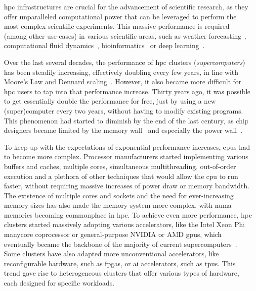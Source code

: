 \gls{hpc} infrastructures are crucial for the advancement of scientific
research, as they offer unparalleled computational power that can be leveraged to perform the most
complex scientific experiments. This massive performance is required (among other use-cases) in
various scientific areas, such as weather forecasting~\cite{wrf}, computational fluid
dynamics~\cite{cfd}, bioinformatics~\cite{bioinformatics} or deep
learning~\cite{hpcdl}.

Over the last several decades, the performance of \gls{hpc} clusters
(\emph{supercomputers}) has been steadily increasing, effectively doubling every few years, in line
with Moore's Law and Dennard scaling~\cite{mooreslaw}. However, it also became more difficult
for \gls{hpc} users to tap into that performance increase. Thirty years ago, it was
possible to get essentially double the performance for free, just by using a new (super)computer
every two years, without having to modify existing programs. This phenomenon had started to
diminish by the end of the last century, as chip designers became limited by the memory
wall~\cite{memorywall} and especially the power wall~\cite{powerwall}.

To keep up with the expectations of exponential performance increases, \glspl{cpu} had
to become more complex. Processor manufacturers started implementing various buffers and caches,
multiple cores, simultaneous multithreading, out-of-order execution and a plethora of other
techniques that would allow the \gls{cpu} to run faster, without requiring massive
increases of power draw or memory bandwidth. The existence of multiple cores and sockets and the
need for ever-increasing memory sizes has also made the memory system more complex, with
\gls{numa} memories becoming commonplace in \gls{hpc}. To achieve even
more performance, \gls{hpc} clusters started massively adopting various accelerators,
like the Intel Xeon Phi~\cite{xeonphi} manycore coprocessor or general-purpose NVIDIA or
AMD \glspl{gpu}, which eventually became the backbone of the majority of current
supercomputers~\cite{top500gpu}. Some clusters have also adapted more unconventional
accelerators, like reconfigurable hardware, such as \glspl{fpga}, or
\gls{ai} accelerators, such as \glspl{tpu}. This trend gave rise to
heterogeneous clusters that offer various types of hardware, each designed for specific workloads.

